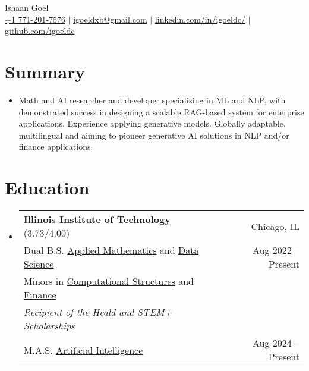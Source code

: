 \documentclass[letterpaper,10pt]{article}
\newcommand\indentsize{10pt}
\newcommand{\resumeSubHeadingListStart}{\begin{itemize}[leftmargin=0.15in, label=]}
\newcommand{\resumeSubHeadingListEnd}{\end{itemize}}
\begin{document}
\begin{center}
    \Huge Ishaan Goel \\ \vspace{2pt}
    \large
    \href{tel:17712017576}{+1 771-201-7576}
    $|$ \href{mailto:igoeldxb@gmail.com}{igoeldxb@gmail.com}
    $|$ \href{https://linkedin.com/in/igoeldc/}{linkedin.com/in/igoeldc/}
    $|$ \href{https://github.com/igoeldc}{github.com/igoeldc}
\end{center}


\section{Summary}
  \resumeSubHeadingListStart
    \item{Math and AI researcher and developer specializing in ML and NLP, with demonstrated success in designing a scalable RAG-based system for enterprise applications. Experience applying generative models. Globally adaptable, multilingual and aiming to pioneer generative AI solutions in NLP and/or finance applications.}\vspace{-5pt}
  \resumeSubHeadingListEnd


\newcommand{\resumeEducationHeading}[9]{
  \item
    \begin{tabular*}{0.97\textwidth}[t]{l@{\extracolsep{\fill}}r}
      \textbf{#1} {#2} & #3 \\
      \hspace{\indentsize} #4 & #5 \\
      \hspace{20pt} #6 & \\
      \hspace{20pt} \textit{#7} & \\
      \hspace{\indentsize} #8 & #9
    \end{tabular*}
}

\section{Education}
  \resumeSubHeadingListStart
    \resumeEducationHeading
      {\href{https://www.iit.edu/}{Illinois Institute of Technology}}{(3.73/4.00)}{Chicago, IL}{Dual B.S. \href{https://catalog.iit.edu/undergraduate/colleges/computing/applied-mathematics/bs/\#text}{Applied Mathematics} and \href{https://catalog.iit.edu/undergraduate/colleges/computing/computer-science/\#:~:text=The\%20B.S.\%20in\%20Data,be\%20successful\%20data\%20science\%20professionals.}{Data Science}}{Aug 2022 -- Present}{Minors in \href{https://catalog.iit.edu/undergraduate/colleges/computing/computer-science/minor-computational-structures/}{Computational Structures} and \href{https://catalog.iit.edu/undergraduate/colleges/business/minor-finance/\#:~:text=business\%20schools\%20worldwide.-,Required\%20Courses,-Course\%20List}{Finance}}
      {Recipient of the Heald and STEM+ Scholarships}{M.A.S. \href{https://catalog.iit.edu/graduate/colleges/computing/computer-science/master-artificial-intelligence/\#overviewtext}{Artificial Intelligence}}{Aug 2024 -- Present}
  \resumeSubHeadingListEnd
\end{document}
